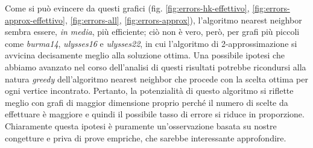 Come si può evincere da questi grafici (fig. \ref{fig:errors-hk-effettivo}, \ref{fig:errors-approx-effettivo}, \ref{fig:errors-all}, \ref{fig:errors-approx}), l'algoritmo nearest neighbor sembra essere, \textit{in media}, più efficiente; ciò non è vero, però, per grafi più piccoli come \textit{burma14}, \textit{ulysses16} e \textit{ulysses22}, in cui l'algoritmo di 2-approssimazione si avvicina decisamente meglio alla soluzione ottima. 
Una possibile ipotesi che abbiamo avanzato nel corso dell'analisi di questi risultati potrebbe ricondursi alla natura \textit{greedy} dell'algoritmo nearest neighbor che procede con la scelta ottima per ogni vertice incontrato. Pertanto, la potenzialità di questo algoritmo si riflette meglio con grafi di maggior dimensione proprio perché il numero di scelte da effettuare è maggiore e quindi il possibile tasso di errore si riduce in proporzione. Chiaramente questa ipotesi è puramente un'osservazione basata su nostre congetture e priva di prove empriche, che sarebbe interessante approfondire. 



